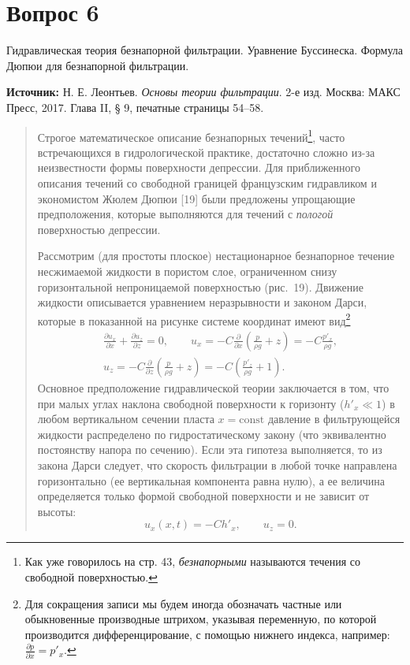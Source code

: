 \documentclass[12pt,a4paper]{article}
\begin{document}
\section*{Вопрос 6}
\noindent Гидравлическая теория безнапорной фильтрации. Уравнение Буссинеска. Формула Дюпюи для безнапорной фильтрации.

\medskip
\noindent\textbf{Источник:} Н. Е. Леонтьев. \textit{Основы теории фильтрации}. 2-е изд. Москва: МАКС Пресс, 2017. Глава II, § 9, печатные страницы 54--58.
\par\bigskip
\begin{quote}\sloppy
Строгое математическое описание безнапорных течений\footnote{Как уже говорилось на стр. 43, \textit{безнапорными} называются течения со свободной поверхностью.}, часто встречающихся в гидрологической практике, достаточно сложно из-за неизвестности формы поверхности депрессии. Для приближенного описания течений со свободной границей французским гидравликом и экономистом Жюлем Дюпюи [19] были предложены упрощающие предположения, которые выполняются для течений с \textit{пологой} поверхностью депрессии.


Рассмотрим (для простоты плоское) нестационарное безнапорное течение несжимаемой жидкости в пористом слое, ограниченном снизу горизонтальной непроницаемой поверхностью (рис.~19). Движение жидкости описывается уравнением неразрывности и законом Дарси, которые в показанной на рисунке системе координат имеют вид\footnote{Для сокращения записи мы будем иногда обозначать частные или обыкновенные производные штрихом, указывая переменную, по которой производится дифференцирование, с помощью нижнего индекса, например: $\frac{\partial p}{\partial x}=p'_x$.}
\begin{equation}\begin{gathered}
\frac{\partial u_x}{\partial x}+\frac{\partial u_z}{\partial z}=0,\qquad u_x=-C\frac{\partial}{\partial x}\left(\frac{p}{\rho g}+z\right)=-C\frac{p'_x}{\rho g},\\
u_z=-C\frac{\partial}{\partial z}\left(\frac{p}{\rho g}+z\right)=-C\left(\frac{p'_z}{\rho g}+1\right).
\end{gathered}\tag{9.1}\label{q6:eq-9-1}\end{equation}
Основное предположение гидравлической теории заключается в том, что при малых углах наклона свободной поверхности к горизонту ($h'_x\ll1$) в любом вертикальном сечении пласта $x=\mathrm{const}$ давление в фильтрующейся жидкости распределено по гидростатическому закону (что эквивалентно постоянству напора по сечению). Если эта гипотеза выполняется, то из закона Дарси следует,
что скорость фильтрации в любой точке направлена горизонтально (ее вертикальная компонента равна нулю), а ее величина определяется только формой свободной поверхности и не зависит от высоты:
\[u_x(x,t)=-Ch'_x,\qquad u_z=0.\]
\par\nobreak{}\par
\end{quote}
\end{document}
